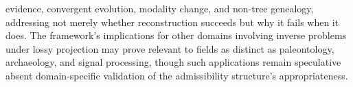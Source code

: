 evidence, convergent evolution, modality change, and non-tree genealogy, addressing not merely whether reconstruction succeeds but why it fails when it does. The framework's implications for other domains involving inverse problems under lossy projection may prove relevant to fields as distinct as paleontology, archaeology, and signal processing, though such applications remain speculative absent domain-specific validation of the admissibility structure's appropriateness.
